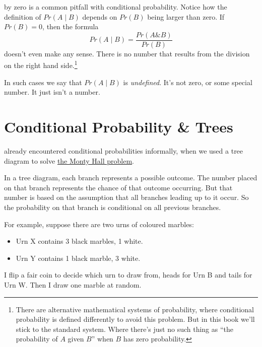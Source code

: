 \documentclass[justified]{tufte-book}
\providecommand{\tightlist}{%
  \setlength{\itemsep}{0pt}\setlength{\parskip}{0pt}}
\newcommand{\given}{\mid}
\renewcommand{\wedge}{\mathbin{\&}}
\newcommand{\p}{Pr}
\theoremstyle{definition}
\theoremstyle{definition}
\theoremstyle{definition}
\theoremstyle{remark}
\begin{document}
 by zero is a common pitfall with conditional
probability. Notice how the definition of \(\p(A \given B)\) depends on
\(\p(B)\) being larger than zero. If \(\p(B) = 0\), then the formula
\[ \p(A \given B) = \frac{\p(A \wedge B)}{\p(B)} \] doesn't even make
any sense. There is no number that results from the division on the
right hand side.\footnote{There are alternative mathematical systems of
  probability, where conditional probability is defined differently to
  avoid this problem. But in this book we'll stick to the standard
  system. Where there's just no such thing as ``the probability of \(A\)
  given \(B\)'' when \(B\) has zero probability.}

In such cases we say that \(\p(A \given B)\) is \emph{undefined}. It's
not zero, or some special number. It just isn't a number.

\hypertarget{conditional-probability-trees}{%
\section{Conditional Probability \&
Trees}\label{conditional-probability-trees}}

 already encountered conditional probabilities
informally, when we used a tree diagram to solve
\protect\hyperlink{the-monty-hall-problem}{the Monty Hall problem}.

In a tree diagram, each branch represents a possible outcome. The number
placed on that branch represents the chance of that outcome occurring.
But that number is based on the assumption that all branches leading up
to it occur. So the probability on that branch is conditional on all
previous branches.

For example, suppose there are two urns of coloured marbles:

\begin{itemize}
\tightlist
\item
  Urn X contains 3 black marbles, 1 white.
\item
  Urn Y contains 1 black marble, 3 white.
\end{itemize}

I flip a fair coin to decide which urn to draw from, heads for Urn B and
tails for Urn W. Then I draw one marble at random.
\end{document}
